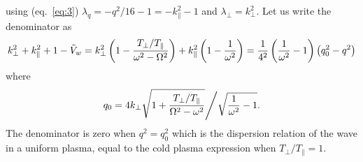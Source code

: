\documentclass[12pt]{article}
\begin{document}
using (eq.\ \ref{eq:3}) $\lambda_q=-q^2/16-1=-k_\parallel^2-1$ and
$\lambda_\perp=k_\perp^2$.
Let us write the denominator as
\begin{equation}
  \label{eq:25}
  k_\perp^2+k_\parallel^2+1-\tilde
  V_w=k_\perp^2\left(1-{T_\perp/T_\parallel\over\omega^2-\Omega^2}\right)
  +k_\parallel^2\left(1-{1\over\omega^2}\right)
= {1\over4^2}\left({1\over\omega^2}-1\right)\left(q_0^2-q^2\right)
\end{equation}
where
\begin{equation}
  \label{eq:26}
  q_0=4k_\perp\sqrt{1+{T_\perp/T_\parallel\over\Omega^2-\omega^2}}
  \Bigg/\sqrt{{1\over\omega^2}-1}.
\end{equation}
The denominator is zero when $q^2=q_0^2$ which is the
dispersion relation of the wave in a uniform plasma, equal to the cold
plasma expression when $T_\perp/T_\parallel=1$.
\end{document}

